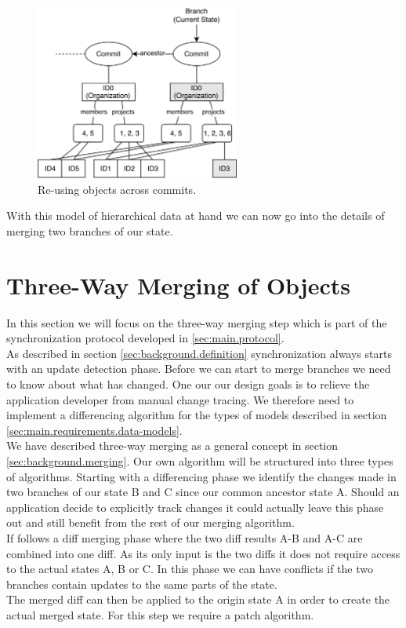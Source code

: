 \begin{figure}[commits]
  \centering
  \includegraphics[width=0.6\textwidth]{img/commits}
  \caption{Re-using objects across commits.}
  \label{fig:histo.commits}
\end{figure}

With this model of hierarchical data at hand we can now go into the details of merging two branches of our state.

\section{Three-Way Merging of Objects}
\label{sec:main.histo.merging}
In this section we will focus on the three-way merging step which is part of the synchronization protocol developed in \ref{sec:main.protocol}.\\
As described in section \ref{sec:background.definition} synchronization always starts with an update detection phase.
Before we can start to merge branches we need to know about what has changed.
One our our design goals is to relieve the application developer from manual change tracing.
We therefore need to implement a differencing algorithm for the types of models described in section \ref{sec:main.requirements.data-models}.\\
We have described three-way merging as a general concept in section \ref{sec:background.merging}.
Our own algorithm will be structured into three types of algorithms.
Starting with a differencing phase we identify the changes made in two branches of our state B and C since our common ancestor state A.
Should an application decide to explicitly track changes it could actually leave this phase out and still benefit from the rest of our merging algorithm.\\
If follows a diff merging phase where the two diff results A-B and A-C are combined into one diff.
As its only input is the two diffs it does not require access to the actual states A, B or C.
In this phase we can have conflicts if the two branches contain updates to the same parts of the state.\\
The merged diff can then be applied to the origin state A in order to create the actual merged state.
For this step we require a patch algorithm.

